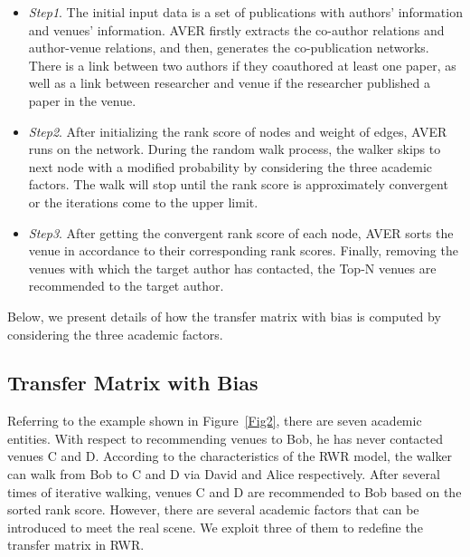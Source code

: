 \documentclass[9pt]{acm_proc_article-sp}
\begin{document}
\begin{itemize}
  \item \emph{Step1}. The initial input data is a set of publications with authors' information and venues' information. AVER firstly extracts the co-author relations and author-venue relations, and then, generates the co-publication networks. There is a link between two authors if they coauthored at least one paper, as well as a link between researcher and venue if the researcher published a paper in the venue.
  \item \emph{Step2}. After initializing the rank score of nodes and weight of edges, AVER runs on the network. During the random walk process, the walker skips to next node with a modified probability by considering the three academic factors. The walk will stop until the rank score is approximately convergent or the iterations come to the upper limit.
  \item \emph{Step3}. After getting the convergent rank score of each node, AVER sorts the venue in accordance to their corresponding rank scores. Finally, removing the venues with which the target author has contacted, the Top-N venues are recommended to the target author.
\end{itemize}

Below, we present details of how the transfer matrix with bias is computed by considering the three academic factors.

\subsection{Transfer Matrix with Bias}
Referring to the example shown in Figure~\ref{Fig2}, there are seven academic entities. With respect to recommending venues to Bob, he has never contacted venues C and D. According to the characteristics of the RWR model, the walker can walk from Bob to C and D via David and Alice respectively. After several times of iterative walking, venues C and D are recommended to Bob based on the sorted rank score. However, there are several academic factors that can be introduced to meet the real scene. We exploit three of them to redefine the transfer matrix in RWR.
\end{document}
